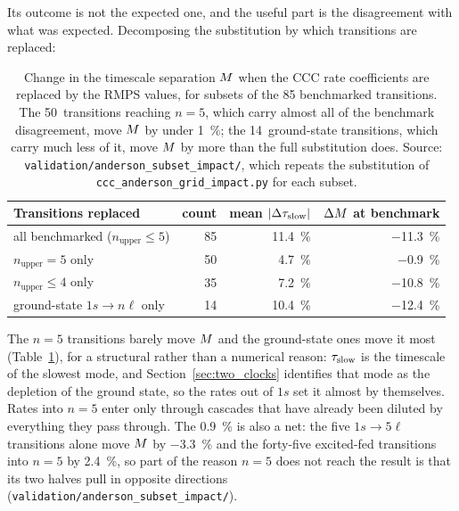 Its outcome is not the expected one, and the useful part is the disagreement
with what was expected. Decomposing the substitution by which transitions are
replaced:

\begin{table}[tbp]
  \centering
  \caption[Which transitions carry the atomic-data sensitivity]{Change in the
  timescale separation $M$ when the CCC rate coefficients are replaced by
  the RMPS values, for subsets of the 85 benchmarked transitions. The
  50~transitions reaching $n=5$, which carry almost all of the benchmark
  disagreement, move $M$ by under \SI{1}{\percent}; the 14~ground-state
  transitions, which carry much less of it, move $M$ by more than the full
  substitution does. Source:
  \texttt{validation/anderson\_subset\_impact/}, which repeats the
  substitution of \texttt{ccc\_anderson\_grid\_impact.py} for each subset.}
  \label{tab:atomic_sensitivity}
  \begin{tabular}{lrrr}
    \toprule
    Transitions replaced & count & mean $|\Delta\tau_{\mathrm{slow}}|$ & $\Delta M$ at benchmark \\
    \midrule
    all benchmarked ($n_{\text{upper}} \le 5$) & 85 & \SI{11.4}{\percent} & \SI{-11.3}{\percent} \\
    $n_{\text{upper}} = 5$ only                & 50 & \SI{4.7}{\percent}  & \SI{-0.9}{\percent} \\
    $n_{\text{upper}} \le 4$ only              & 35 & \SI{7.2}{\percent}  & \SI{-10.8}{\percent} \\
    ground-state $1s \to n\ell$ only           & 14 & \SI{10.4}{\percent} & \SI{-12.4}{\percent} \\
    \bottomrule
  \end{tabular}
\end{table}

The $n=5$ transitions barely move $M$ and the ground-state ones move it most
(Table~\ref{tab:atomic_sensitivity}), for a structural rather than a numerical
reason: $\tau_{\mathrm{slow}}$ is the timescale of the slowest mode, and
Section~\ref{sec:two_clocks} identifies that mode as the depletion of the ground
state, so the rates out of $1s$ set it almost by themselves. Rates into $n=5$
enter only through cascades that have already been diluted by everything they
pass through. The \SI{0.9}{\percent} is also a net: the five $1s \to 5\ell$
transitions alone move $M$ by \SI{-3.3}{\percent} and the forty-five
excited-fed transitions into $n=5$ by \SI{+2.4}{\percent}, so part of the
reason $n=5$ does not reach the result is that its two halves pull in opposite
directions (\texttt{validation/anderson\_subset\_impact/}).


